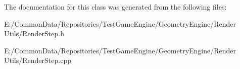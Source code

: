 The documentation for this class was generated from the following files\+:\begin{DoxyCompactItemize}
\item 
E\+:/\+Common\+Data/\+Repositories/\+Test\+Game\+Engine/\+Geometry\+Engine/\+Render Utils/Render\+Step.\+h\item 
E\+:/\+Common\+Data/\+Repositories/\+Test\+Game\+Engine/\+Geometry\+Engine/\+Render Utils/Render\+Step.\+cpp\end{DoxyCompactItemize}

